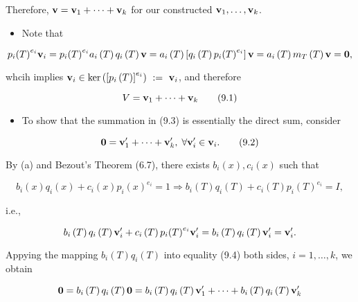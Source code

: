 \documentclass[11pt]{article}
\begin{document}
Therefore, \(\mathbf{v} = {\bf v}_1 + \cdots  + {\bf v}_{k}\) for our constructed \({\bf v}_1,\ldots ,{\bf v}_{k}\).

\begin{itemize}
\item Note that
\end{itemize}

\[
{p}_{i}{\left( T\right) }^{{e}_{i}}{\bf v}_{i} = {p}_{i}{\left( T\right) }^{{e}_{i}}{a}_{i}\left( T\right) {q}_{i}\left( T\right) \mathbf{v} = {a}_{i}\left( T\right) \left\lbrack  {{q}_{i}\left( T\right) {p}_{i}{\left( T\right) }^{{e}_{i}}}\right\rbrack  \mathbf{v} = {a}_{i}\left( T\right) {m}_{T}\left( T\right) \mathbf{v} = \mathbf{0},
\]

whcih implies \({\bf v}_{i} \in  \ker \left( {\left\lbrack  {p}_{i}\left( T\right) \right\rbrack  }^{{e}_{i}}\right)  \mathrel{\text{ := }} {\bf v}_{i}\), and therefore

\[
V = {\bf v}_1 + \cdots  + {\bf v}_{k} \tag{9.1}
\]

\begin{itemize}
\item To show that the summation in (9.3) is essentially the direct sum, consider
\end{itemize}

\[
\mathbf{0} = {\bf v}_1^{\prime } + \cdots  + {\bf v}_{k}^{\prime },\;\forall {\bf v}_{i}^{\prime } \in  {\bf v}_{i}. \tag{9.2}
\]

By (a) and Bezout’s Theorem (6.7), there exists \({b}_{i}\left( x\right) ,{c}_{i}\left( x\right)\) such that

\[
{b}_{i}\left( x\right) {q}_{i}\left( x\right)  + {c}_{i}\left( x\right) {p}_{i}{\left( x\right) }^{{e}_{i}} = 1 \Rightarrow  {b}_{i}\left( T\right) {q}_{i}\left( T\right)  + {c}_{i}\left( T\right) {p}_{i}{\left( T\right) }^{{e}_{i}} = I,
\]

i.e.,

\[
{b}_{i}\left( T\right) {q}_{i}\left( T\right) {\bf v}_{i}^{\prime } + {c}_{i}\left( T\right) {p}_{i}{\left( T\right) }^{{e}_{i}}{\bf v}_{i}^{\prime } = {b}_{i}\left( T\right) {q}_{i}\left( T\right) {\bf v}_{i}^{\prime } = {\bf v}_{i}^{\prime }.
\]

Appying the mapping \({b}_{i}\left( T\right) {q}_{i}\left( T\right)\) into equality (9.4) both sides, \(i = 1,\ldots ,k\), we obtain

\[
\mathbf{0} = {b}_{i}\left( T\right) {q}_{i}\left( T\right) \mathbf{0} = {b}_{i}\left( T\right) {q}_{i}\left( T\right) {\bf v}_1^{\prime } + \cdots  + {b}_{i}\left( T\right) {q}_{i}\left( T\right) {\bf v}_{k}^{\prime }
\]
\end{document}
